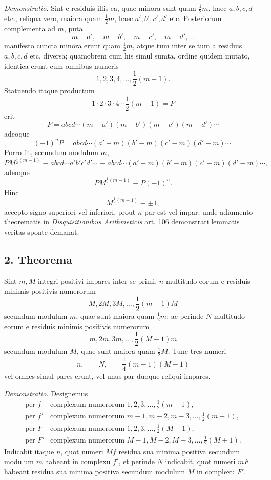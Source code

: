 \documentclass[12pt]{article}
\begin{document}
\emph{Demonstratio.} Sint e residuis illis ea, quae minora sunt quam $\frac12m$, haec $a,b,c,d$ etc., reliqua vero, maiora quam $\frac12m$, haec $a',b',c',d'$ etc. Posteriorum complementa ad $m$, puta
\[
m-a',\quad m-b',\quad m-c',\quad m-d',\ldots
\]
manifesto cuncta minora erunt quam $\frac12m$, atque tum inter se tum a residuis $a,b,c,d$ etc. diversa; quamobrem cum his simul sumta, ordine quidem mutato, identica erunt cum omnibus numeris
\[
1,2,3,4,\ldots,\frac12(m-1).
\]
Statuendo itaque productum
\[
1\cdot2\cdot3\cdot4\cdots \frac12(m-1)=P
\]
erit
\[
P=abcd\cdots(m-a')(m-b')(m-c')(m-d')\cdots
\]
adeoque
\[
(-1)^nP=abcd\cdots(a'-m)(b'-m)(c'-m)(d'-m)\cdots .
\]
Porro fit, secundum modulum $m$,
\[
PM^{\frac12(m-1)}
 \equiv abcd\cdots a'b'c'd'\cdots
 \equiv abcd\cdots(a'-m)(b'-m)(c'-m)(d'-m)\cdots,
\]
adeoque
\[
PM^{\frac12(m-1)}\equiv P(-1)^n.
\]
Hinc
\[
M^{\frac12(m-1)}\equiv \pm1,
\]
accepto signo superiori vel inferiori, prout $n$ par est vel impar; unde adiumento theorematis in \emph{Disquisitionibus Arithmeticis} art. 106 demonstrati lemmatis veritas sponte demanat.

\subsection*{2. Theorema}

Sint $m,M$ integri positivi impares inter se primi, $n$ multitudo eorum e residuis minimis positivis numerorum
\[
M,2M,3M,\ldots,\frac12(m-1)M
\]
secundum modulum $m$, quae sunt maiora quam $\frac12m$; ac perinde $N$ multitudo eorum e residuis minimis positivis numerorum
\[
m,2m,3m,\ldots,\frac12(M-1)m
\]
secundum modulum $M$, quae sunt maiora quam $\frac12M$. Tunc tres numeri
\[
n,\qquad N,\qquad \frac14(m-1)(M-1)
\]
vel omnes simul pares erunt, vel unus par duoque reliqui impares.

\emph{Demonstratio.} Designemus
\[
\begin{array}{ll}
\text{per } f & \text{complexum numerorum }1,2,3,\ldots,\frac12(m-1),\\
\text{per } f'& \text{complexum numerorum }m-1,m-2,m-3,\ldots,\frac12(m+1),\\
\text{per } F & \text{complexum numerorum }1,2,3,\ldots,\frac12(M-1),\\
\text{per } F'& \text{complexum numerorum }M-1,M-2,M-3,\ldots,\frac12(M+1).
\end{array}
\]
Indicabit itaque $n$, quot numeri $Mf$ residua sua minima positiva secundum modulum $m$ habeant in complexu $f'$, et perinde $N$ indicabit, quot numeri $mF$ habeant residua sua minima positiva secundum modulum $M$ in complexu $F'$.
\end{document}
